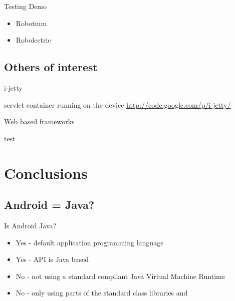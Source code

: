 \documentclass[aspectratio=169]{beamer}
\newcommand{\surl}[1] {{\tiny \url{#1}}}
\begin{document}
    \begin{frame}{Testing Demo}
      \begin{itemize}
       \item Robotium
       \item Robolectric
      \end{itemize}
    \end{frame}

  \subsection{Others of interest}  

    \begin{frame}{i-jetty}
      \begin{description}
       \item<1->[i-jetty] servlet container running on the device \surl{http://code.google.com/p/i-jetty/}
      \end{description}
    \end{frame}

    \begin{frame}{Web based frameworks}
      \begin{description}
       \item<1->[PhoneGap] test
      \end{description}
    \end{frame}

\section{Conclusions}

  \subsection{Android = Java?}
    \begin{frame}{Is Android Java?}
      \begin{itemize}
      \item<1-> Yes - default application programming language
      \item<2-> Yes - API is Java based
      \item<3-> No - not using a standard compliant Java Virtual Machine Runtime
      \item<4-> No - only using parts of the standard class libraries and 
      \end{itemize}
    \end{frame}
\end{document}
